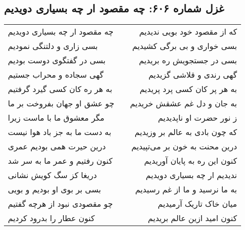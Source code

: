 \begin{center}
\section*{غزل شماره ۶۰۶: چه مقصود ار چه بسیاری دویدیم}
\label{sec:606}
\begin{longtable}{l p{0.5cm} r}
چه مقصود ار چه بسیاری دویدیم
&&
که از مقصود خود بویی ندیدیم
\\
بسی زاری و دلتنگی نمودیم
&&
بسی خواری و بی برگی کشیدیم
\\
بسی در گفتگوی دوست بودیم
&&
بسی در جستجویش ره بریدیم
\\
گهی سجاده و محراب جستیم
&&
گهی رندی و قلاشی گزیدیم
\\
به هر ره کان کسی گیرد گرفتیم
&&
به هر پر کان کسی پرد پریدیم
\\
چو عشق او جهان بفروخت بر ما
&&
به جان و دل غم عشقش خریدیم
\\
مگر معشوق ما با ماست زیرا
&&
ز نور حضرت او ناپدیدیم
\\
به دست ما به جز باد هوا نیست
&&
که چون بادی به عالم بر وزیدیم
\\
درین حیرت همی بودیم عمری
&&
درین محنت به خون بر می‌تپیدیم
\\
کنون رفتیم و عمر ما به سر شد
&&
کنون این ره به پایان آوریدیم
\\
دریغا کز سگ کویش نشانی
&&
ندیدیم ار چه بسیاری دویدیم
\\
بسی بر بوی او بودیم و بویی
&&
به ما نرسید و ما از غم رسیدیم
\\
چو مقصودی نبود از هرچه گفتیم
&&
میان خاک تاریک آرمیدیم
\\
کنون عطار را بدرود کردیم
&&
کنون امید ازین عالم بریدیم
\\
\end{longtable}
\end{center}
